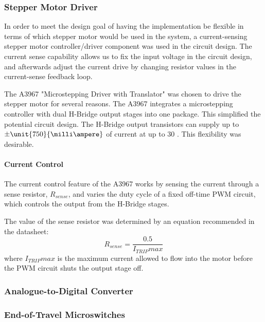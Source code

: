 \subsubsection{Stepper Motor Driver}

In order to meet the design goal of having the implementation be flexible in terms of which stepper motor would be used in the system, a current-sensing stepper motor controller/driver component was used in the circuit design. The current sense capability allows us to fix the input voltage in the circuit design, and afterwards adjust the current drive by changing resistor values in the current-sense feedback loop. 

The A3967 "Microstepping Driver with Translator" was chosen to drive the stepper motor for several reasons. The A3967 integrates a microstepping controller with dual H-Bridge output stages into one package. This simplified the potential circuit design. The H-Bridge output transistors can supply up to $\pm\unit{750}{\milli\ampere}$ of current at up to \unit{30}{\volt} \cite{A3967}. This flexibility was desirable.

\paragraph{Current Control}

The current control feature of the A3967 works by sensing the current through a sense resistor, $R_{sense}$, and varies the duty cycle of a fixed off-time PWM circuit, which controls the output from the H-Bridge stages.

The value of the sense resistor was determined by an equation recommended in the datasheet:
\begin{equation}
R_{sense}=\frac{0.5}{I_{TRIP}max}
\end{equation}
where $I_{TRIP}max$ is the maximum current allowed to flow into the motor before the PWM circuit shuts the output stage off.

\subsubsection{Analogue-to-Digital Converter}


\subsubsection{End-of-Travel Microswitches}